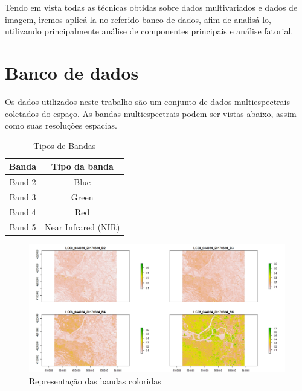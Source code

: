 \documentclass[a4paper,12pt]{article}
\begin{document}
Tendo em vista todas as técnicas obtidas sobre dados multivariados e dados de imagem, iremos aplicá-la no referido banco de dados, afim de analisá-lo, utilizando principalmente análise de componentes principais e análise fatorial.

\section{Banco de dados}

Os dados utilizados neste trabalho são um conjunto de dados multiespectrais coletados do espaço. As bandas multiespectrais podem ser vistas abaixo, assim como suas resoluções espacias.


\begin{table}[ht]
\centering
\caption{Tipos de Bandas} \label{tab:exemplo}
\begin{tabular}{c c}
\hline
 \textbf{Banda} & \textbf{Tipo da banda}\\
\hline 
Band 2 & Blue \\
Band 3 & Green \\
Band 4 & Red \\
Band 5 & Near Infrared (NIR) \\
\hline
\end{tabular}
\end{table}

\begin{center}
\begin{figure}[H]
    \centering
    \includegraphics[width = 1 \textwidth]{banda colorida.jpeg}
    \caption{Representação das bandas coloridas}
\end{figure}    
\end{center}
\end{document}
